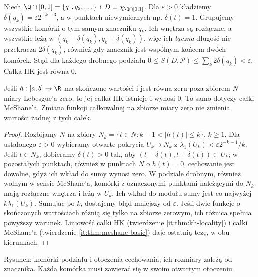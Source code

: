 \begin{przyklad}\label{ma1:kh:ex:dirichlet}
Niech $\Q\cap[0,1]=\{q_1,q_2,\dots\}$ i $D=\chi_{\Q\cap[0,1]}$. Dla $\varepsilon>0$ kładziemy $\delta(q_k)=\varepsilon 2^{-k-3}$, a w punktach niewymiernych np. $\delta(t)=1$. Grupujemy wszystkie komórki o tym samym znaczniku $q_k$. Ich wnętrza są rozłączne, a wszystkie leżą w $(q_k-\delta(q_k),q_k+\delta(q_k))$, więc ich \emph{łączna} długość nie przekracza $2\delta(q_k)$, również gdy znacznik jest wspólnym końcem dwóch komórek. Stąd dla każdego drobnego podziału $0\le S(D,\mathcal P)\le\sum_k 2\delta(q_k)<\varepsilon$. Całka HK jest równa $0$.
\end{przyklad}
\begin{lemat}\label{ma1:kh:lem:kh-null-modification}\label{it:lem:kh-null-modification}
Jeśli $h:[a,b]\to\R$ ma skończone wartości i jest równa zeru poza zbiorem $N$ miary Lebesgue'a zero, to jej całka HK istnieje i wynosi $0$. To samo dotyczy całki McShane'a. Zmiana funkcji całkowalnej na zbiorze miary zero nie zmienia wartości żadnej z tych całek.
\end{lemat}
\begin{proof}
Rozbijamy $N$ na zbiory $N_k=\{t\in N:k-1<|h(t)|\le k\}$, $k\ge1$. Dla ustalonego $\varepsilon>0$ wybieramy otwarte pokrycia $U_k\supset N_k$ z $\lambda_1(U_k)<\varepsilon2^{-k-1}/k$. Jeśli $t\in N_k$, dobieramy $\delta(t)>0$ tak, aby $(t-\delta(t),t+\delta(t))\subset U_k$; w pozostałych punktach, również w punktach $N$ o $h(t)=0$, cechowanie jest dowolne, gdyż ich wkład do sumy wynosi zero. W podziale drobnym, również wolnym w sensie McShane'a, komórki z oznaczonymi punktami należącymi do $N_k$ mają rozłączne wnętrza i leżą w $U_k$. Ich wkład do modułu sumy jest co najwyżej $k\lambda_1(U_k)$. Sumując po $k$, dostajemy błąd mniejszy od $\varepsilon$. Jeśli dwie funkcje o skończonych wartościach różnią się tylko na zbiorze zerowym, ich różnica spełnia powyższy warunek. Liniowość całki HK (twierdzenie \ref{it:thm:kh-locality}) i całki McShane'a (twierdzenie \ref{it:thm:mcshane-basic}) daje ostatnią tezę, w obu kierunkach.
\end{proof}

\begin{center}

\small Rysunek: komórki podziału i otoczenia cechowania; ich rozmiary zależą od znacznika. Każda komórka musi zawierać się w swoim otwartym otoczeniu.
\end{center}
